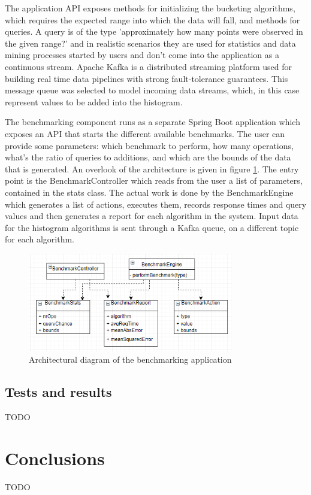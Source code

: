 \documentclass[12pt]{article}
\begin{document}
	The application API exposes methods for initializing the bucketing algorithms, 
	which requires the expected range into which the data will fall, and methods 
	for queries. A query is of the type 'approximately how many points were observed
	in the given range?' and in realistic scenarios they are used for statistics 
	and data mining processes started by users and don't come into the application 
	as a continuous stream. Apache Kafka\cite{Kafka} is a distributed streaming platform
	used for building real time data pipelines with strong fault-tolerance guarantees.
	This message queue was selected to model incoming data streams, which, in this 
	case represent values to be added into the histogram.

	The benchmarking component runs as a separate Spring Boot application which 
	exposes an API that starts the different available benchmarks. The user 
	can provide some parameters: which benchmark to perform, how many operations, 
	what's the ratio of queries to additions, and which are the bounds of the data that is 
	generated. An overlook of the architecture is given in figure \ref{architecture}.
	The entry point is the BenchmarkController which reads from the user a list of 
	parameters, contained in the stats class. The actual work is done by the BenchmarkEngine
	which generates a list of actions, executes them, records response times and query values 
	and then generates a report for each algorithm in the system. Input data for the 
	histogram algorithms is sent through a Kafka queue, on a different topic for each 
	algorithm.

	\begin{figure}
		\label{architecture}
		\caption{Architectural diagram of the benchmarking application}
		\centering
		  \includegraphics[width=0.8\textwidth]{diagram.png}
	\end{figure}

	\subsection{Tests and results}
	TODO 

	\section{Conclusions}
	TODO

	\newpage
	
	
\end{document}
